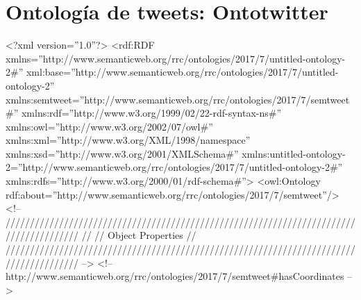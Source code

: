 \chapter{Ontología de tweets: Ontotwitter}
\label{chap:ontotwitter}

\begin{listing}[
  language = XML,
  numbers=left,
  numberstyle=\tiny,
  stepnumber=5,
  numbersep=5pt,
  frame=single,
  caption  = {Ontología de tweets: Ontotwitter},
  label    = code:ontotwitter]
<?xml version=''1.0''?>
<rdf:RDF
xmlns=''http://www.semanticweb.org/rrc/ontologies/2017/7/untitled-ontology-2#''
     xml:base=''http://www.semanticweb.org/rrc/ontologies/2017/7/untitled-ontology-2''
     xmlns:semtweet=''http://www.semanticweb.org/rrc/ontologies/2017/7/semtweet#''
     xmlns:rdf=''http://www.w3.org/1999/02/22-rdf-syntax-ns#''
     xmlns:owl=''http://www.w3.org/2002/07/owl#''
     xmlns:xml=''http://www.w3.org/XML/1998/namespace''
     xmlns:xsd=''http://www.w3.org/2001/XMLSchema#''
     xmlns:untitled-ontology-2=''http://www.semanticweb.org/rrc/ontologies/2017/7/untitled-ontology-2#''
     xmlns:rdfs=''http://www.w3.org/2000/01/rdf-schema#''>
    <owl:Ontology
    rdf:about=''http://www.semanticweb.org/rrc/ontologies/2017/7/semtweet''/>
    <!-- 
    ///////////////////////////////////////////////////////////////////////////////////////
    //
    // Object Properties
    //
    ///////////////////////////////////////////////////////////////////////////////////////
     -->
    <!--
    http://www.semanticweb.org/rrc/ontologies/2017/7/semtweet#hasCoordinates -->


\end{listing}
